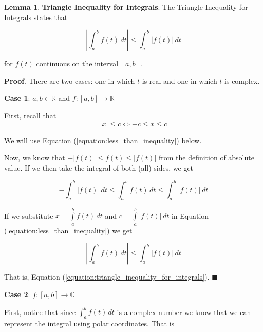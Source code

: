 \documentclass{article}
\theoremstyle{definition}
\newtheorem{lemma}{Lemma}[section]
\begin{document}
\newpage
\bigskip
\begin{lemma} {\bf Triangle Inequality for Integrals}: The Triangle 
Inequality for Integrals states that 

\begin{equation}
\left | \int_{a}^{b} f(t) \,  dt \right | \leq \int_{a}^{b} \left | f(t) \right | \, dt
\label{equation:triangle_inequality_for_integrals}
\end{equation}

\smallskip
\noindent
for $f(t)$ continuous on the interval $[a,b]$. 

\bigskip
\noindent
{\bf Proof}. There are two cases: one in which $t$ is real and one in which
$t$ is complex.

\bigskip
\noindent
{\bf Case 1}: $a,b \in \mathbb{R}$ and $f:[a,b] \to \mathbb{R}$

\bigskip
\noindent
First, recall that 
\begin{equation}
|x| \leq c \Leftrightarrow -c \leq x \leq c
\label{equation:less_than_inequality}
\end{equation}


\bigskip
\noindent
We will use Equation (\ref{equation:less_than_inequality}) below.

\bigskip
\noindent
Now, we know that $-|f(t)| \leq f(t) \leq | f(t) |$ from the 
definition of absolute value. If we then take the integral
of both (all) sides, we get

\begin{equation*}
-\int_{a}^{b} |f(t)| \, dt \leq \int_{a}^{b} f(t) \, dt \leq 
\int_{a}^{b} |f(t)| \, dt
\end{equation*}

\smallskip
\noindent
If we substitute 
$x = \int\limits_{a}^{b} f(t) \, dt$ and $c = \int\limits_{a}^{b} 
|f(t)| \, dt$ in Equation (\ref{equation:less_than_inequality}) 
we get 


\bigskip
\begin{equation*}
\left | \int_{a}^{b} f(t) \,  dt \right | \leq \int_{a}^{b} \left | f(t) 
\right | \, dt
\end{equation*}

\bigskip
\noindent
That is, Equation (\ref{equation:triangle_inequality_for_integrals}). 
$\blacksquare$

\bigskip
\noindent
{\bf Case 2}: $f:[a,b] \to \mathbb{C}$


\bigskip
\noindent
First, notice that since $\int_{a}^{b} f(t) \, dt$
is a complex number we know that we can represent
the integral using polar coordinates. That is


\end{lemma}
\end{document}
